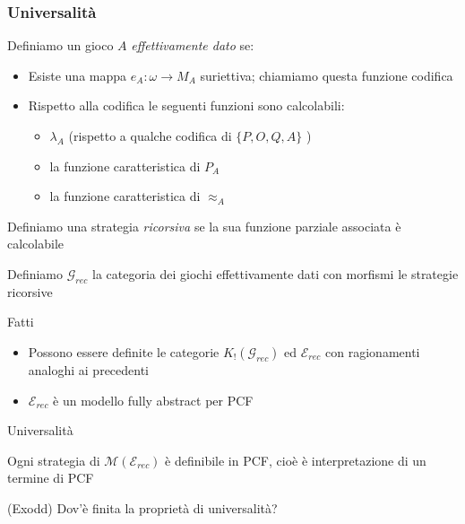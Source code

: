 \documentclass{beamer}
\begin{document}
\begin{frame}
	
	\frametitle{Universalità}
	
	Definiamo un gioco $A$ \emph{effettivamente dato} se:
	\begin{itemize}
		\item Esiste una mappa $e_A : \omega \rightarrow M_A$ suriettiva; chiamiamo questa funzione codifica
		\item Rispetto alla codifica le seguenti funzioni sono calcolabili:
		\begin{itemize}
			\item $\lambda_A$ (rispetto a qualche codifica di $\{ P,O,Q,A \}$ )
			\item la funzione caratteristica di $P_A$
			\item la funzione caratteristica di $\approx_A$
		\end{itemize}
		
	\end{itemize}
	
	Definiamo una strategia \emph{ricorsiva} se la sua funzione parziale associata è calcolabile
	
	
\end{frame}

\begin{frame}
	
	Definiamo $\mathcal{G}_{rec}$ la categoria dei giochi effettivamente dati con morfismi le strategie ricorsive
	
	\begin{block}{Fatti}
		
		\begin{itemize}
			\item Possono essere definite le categorie $K_!(\mathcal{G}_{rec})$ ed $\mathcal{E}_{rec}$ con ragionamenti analoghi ai precedenti
			\item $\mathcal{E}_{rec}$ è un modello fully abstract per PCF
		\end{itemize}
		
	\end{block}
	
	
	\begin{block}{Universalità}
		
		Ogni strategia di $\mathcal{M}(\mathcal{E}_{rec})$ è definibile in PCF, cioè
		è interpretazione di un termine di PCF
		
	\end{block}
	
	
	(Exodd) Dov'è finita la proprietà di universalità?
	
	
\end{frame}
\end{document}
